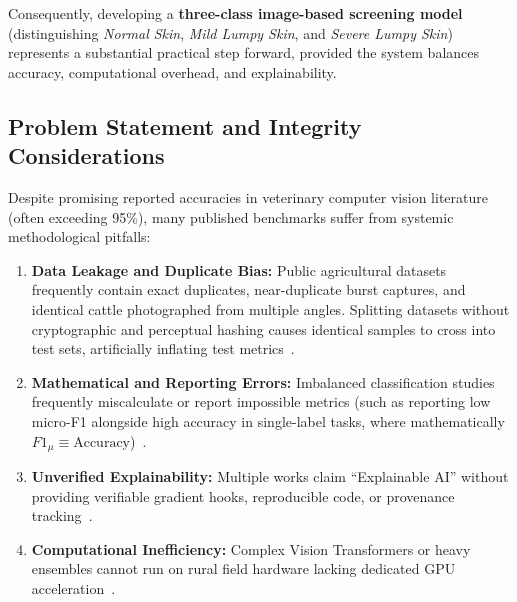 \documentclass[conference]{IEEEtran}
\begin{document}
Consequently, developing a \textbf{three-class image-based screening model} (distinguishing \textit{Normal Skin}, \textit{Mild Lumpy Skin}, and \textit{Severe Lumpy Skin}) represents a substantial practical step forward, provided the system balances accuracy, computational overhead, and explainability.

\subsection{Problem Statement and Integrity Considerations}
Despite promising reported accuracies in veterinary computer vision literature (often exceeding 95\%), many published benchmarks suffer from systemic methodological pitfalls:
\begin{enumerate}
    \item \textbf{Data Leakage and Duplicate Bias:} Public agricultural datasets frequently contain exact duplicates, near-duplicate burst captures, and identical cattle photographed from multiple angles. Splitting datasets without cryptographic and perceptual hashing causes identical samples to cross into test sets, artificially inflating test metrics~\cite{zech2018variable, kapoor2023leakage}.
    \item \textbf{Mathematical and Reporting Errors:} Imbalanced classification studies frequently miscalculate or report impossible metrics (such as reporting low micro-F1 alongside high accuracy in single-label tasks, where mathematically $F1_{\mu} \equiv \text{Accuracy}$)~\cite{mongan2020checklist, collins2024tripod}.
    \item \textbf{Unverified Explainability:} Multiple works claim ``Explainable AI'' without providing verifiable gradient hooks, reproducible code, or provenance tracking~\cite{selvaraju2017gradcam, ghassemi2021false}.
    \item \textbf{Computational Inefficiency:} Complex Vision Transformers or heavy ensembles cannot run on rural field hardware lacking dedicated GPU acceleration~\cite{dosovitskiy2021image, kelly2019key}.
\end{enumerate}
\end{document}
